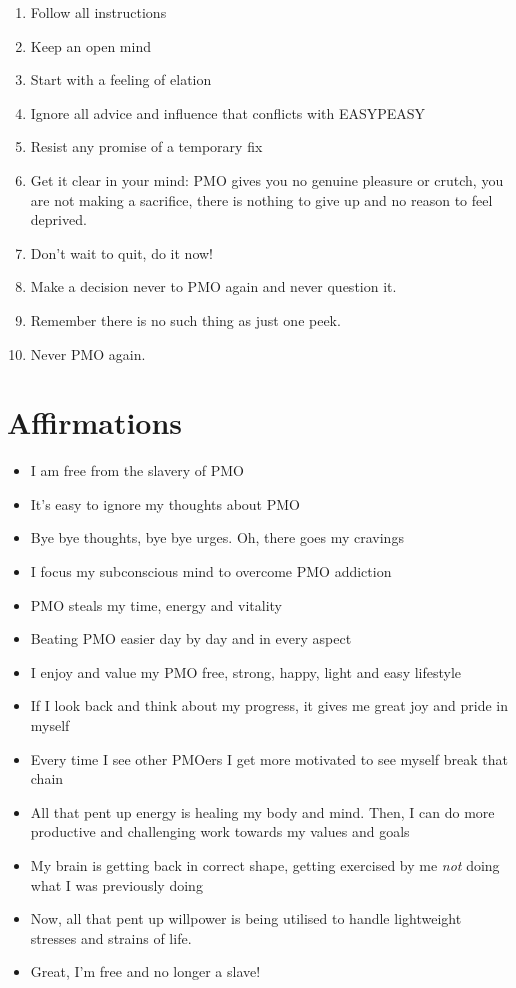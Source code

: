 \documentclass[easypeasy.tex]{subfiles}
\begin{document}
\begin{enumerate}
\item Follow all instructions
\item Keep an open mind
\item Start with a feeling of elation
\item Ignore all advice and influence that conflicts with EASYPEASY
\item Resist any promise of a temporary fix
\item Get it clear in your mind: PMO gives you no genuine pleasure or crutch, you are not making a sacrifice, there is nothing to give up and no reason to feel deprived.
\item Don't wait to quit, do it now!
\item Make a decision never to PMO again and never question it.
\item Remember there is no such thing as just one peek.
\item Never PMO again.
\end{enumerate}

\section{Affirmations}

\begin{itemize}
\item I am free from the slavery of PMO
\item It's easy to ignore my thoughts about PMO
\item Bye bye thoughts, bye bye urges. Oh, there goes my cravings
\item I focus my subconscious mind to overcome PMO addiction
\item PMO steals my time, energy and vitality
\item Beating PMO easier day by day and in every aspect
\item I enjoy and value my PMO free, strong, happy, light and easy lifestyle
\item If I look back and think about my progress, it gives me great joy and pride in myself
\item Every time I see other PMOers I get more motivated to see myself break that chain
\item All that pent up energy is healing my body and mind. Then, I can do more productive and challenging work towards my values and goals
\item My brain is getting back in correct shape, getting exercised by me \textit{not} doing what I was previously doing
\item Now, all that pent up willpower is being utilised to handle lightweight stresses and strains of life.
\item Great, I'm free and no longer a slave!
\end{itemize}
\end{document}
